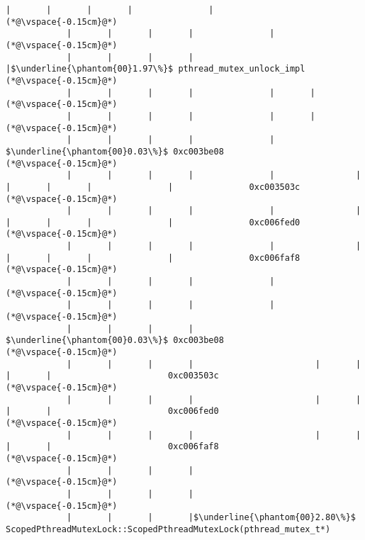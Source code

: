 \begin{lstlisting}[caption=Unicode-merkkijonon osoitinoperaatio, label=profile:C2JReadUnicode-512, numberbychapter=true, frame=lines, float, floatplacement=t]
            |       |       |       |               |
(*@\vspace{-0.15cm}@*)
            |       |       |       |               |
(*@\vspace{-0.15cm}@*)
            |       |       |       |               |$\underline{\phantom{00}1.97\%}$ pthread_mutex_unlock_impl
(*@\vspace{-0.15cm}@*)
            |       |       |       |               |       |
(*@\vspace{-0.15cm}@*)
            |       |       |       |               |       |
(*@\vspace{-0.15cm}@*)
            |       |       |       |               |        $\underline{\phantom{00}0.03\%}$ 0xc003be08
(*@\vspace{-0.15cm}@*)
            |       |       |       |               |                |       |       |       |               |               0xc003503c
(*@\vspace{-0.15cm}@*)
            |       |       |       |               |                |       |       |       |               |               0xc006fed0
(*@\vspace{-0.15cm}@*)
            |       |       |       |               |                |       |       |       |               |               0xc006faf8
(*@\vspace{-0.15cm}@*)
            |       |       |       |               |
(*@\vspace{-0.15cm}@*)
            |       |       |       |               |
(*@\vspace{-0.15cm}@*)
            |       |       |       |                $\underline{\phantom{00}0.03\%}$ 0xc003be08
(*@\vspace{-0.15cm}@*)
            |       |       |       |                        |       |       |       |                       0xc003503c
(*@\vspace{-0.15cm}@*)
            |       |       |       |                        |       |       |       |                       0xc006fed0
(*@\vspace{-0.15cm}@*)
            |       |       |       |                        |       |       |       |                       0xc006faf8
(*@\vspace{-0.15cm}@*)
            |       |       |       |
(*@\vspace{-0.15cm}@*)
            |       |       |       |
(*@\vspace{-0.15cm}@*)
            |       |       |       |$\underline{\phantom{00}2.80\%}$ ScopedPthreadMutexLock::ScopedPthreadMutexLock(pthread_mutex_t*)

\end{lstlisting}
